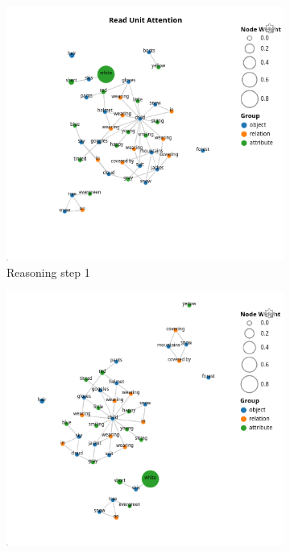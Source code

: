 \begin{figure}[htbp]
    \centering
    \begin{subfigure}[l]{0.4\textwidth}
        \includegraphics[width=\textwidth]{figures/qav/qav_r0.png}
        \caption{Reasoning step 1}
    \end{subfigure}
    \begin{subfigure}[r]{0.4\textwidth}
        \includegraphics[width=\textwidth]{figures/qav/qav_r1.png}

\end{subfigure}
\end{figure}
